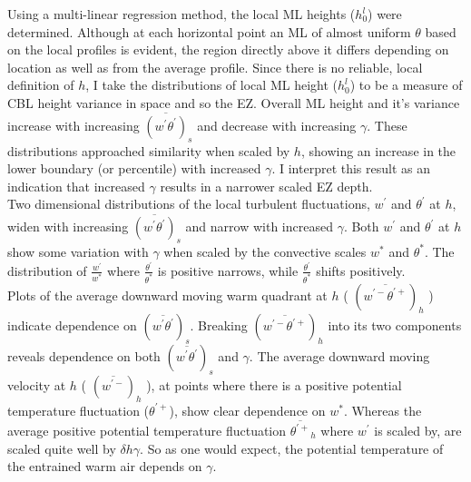 Using a multi-linear regression method, the local \acs{ML} heights ($h^{l}_{0}$) 
were determined.  Although at each horizontal point an \acs{ML} of almost uniform $\theta$ based on the local profiles is evident, the region directly above it differs depending on location as well as from the average profile. 
Since there is no reliable, local definition of $h$, 
I take the distributions of local \acs{ML} height ($h^{l}_{0}$) to be a measure of \acs{CBL} height variance in space and so the \acs{EZ}. Overall \acs{ML} height and it's variance increase with increasing $\overline{(w^{'}\theta^{'})}_{s}$ and decrease with increasing $\gamma$. These distributions approached similarity when scaled by $h$, showing an increase in the lower boundary (or percentile) with increased $\gamma$.  I interpret this result as an indication that increased $\gamma$ results in a narrower scaled \acs{EZ} depth.\\

Two dimensional distributions of the local turbulent fluctuations, $w^{'}$ and $\theta^{'}$ at $h$, widen with increasing $\overline{(w^{'}\theta^{'})}_{s}$ and narrow with increased $\gamma$.  Both $w^{'}$ and $\theta^{'}$ at $h$ show some variation with $\gamma$ when scaled by the convective scales $w^{*}$ and $\theta^{*}$.  The distribution of $\frac{w^{'}}{w^{*}}$ where $\frac{\theta^{'}}{\theta^{*}}$ is positive narrows, while $\frac{\theta^{'}}{\theta^{*}}$ shifts positively.\\

Plots of the average downward moving warm quadrant at $h$ ( $(\overline{w^{'-}\theta^{'+}})_{h}$ ) indicate dependence on $(\overline{w^{'}\theta^{'}})_{s}$. Breaking $(\overline{w^{'-}\theta^{'+}})_{h}$ into its two components reveals dependence on both $(\overline{w^{'}\theta^{'}})_{s}$ and $\gamma$. The average downward moving velocity at $h$ ( $(\overline{w^{'-}})_{h}$ ), at points where there is a positive potential temperature fluctuation ($\theta^{'+}$), show clear dependence on $w^{*}$.  Whereas the average positive potential temperature fluctuation $\overline{\theta^{'+}}_{h}$ where $w^{'}$ is scaled by, are scaled quite well by $\delta h \gamma$. So as one would expect, the potential temperature of the entrained warm air depends on $\gamma$.

\clearpage


